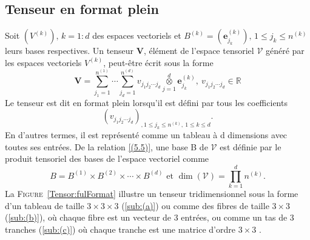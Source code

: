 \documentclass[11pt,a4paper,oneside]{book}
\def\R{\mathbb R}
\def\V{\mathcal V}
\def\vey{\mathbf V}
\def\tensor{\overset{d}{\underset{j=1}{\otimes}}}
\def\e{\mathbf e}
\newcommand{\figref}[1]{\textsc{Figure}~\ref{#1}}
\begin{document}
\subsection{Tenseur en format plein}
Soit $ \left(V^{(k)}\right),\, k=1:d $ des espaces vectoriels et $ B^{(k)}=\left(\e_{j_{k}}^{(k)}\right),\,1\leq j_{k}\leq n^{(k)} $ leurs bases respectives. Un tenseur $ \vey $, élément de l'espace tensoriel $ \V $ généré par les espaces vectoriels $ V^{(k)} $, peut-être écrit sous la forme 
\begin{equation}\label{(5.5)}
\vey =\sum_{j_{1}=1}^{n^{(1)}}\cdots\sum_{j_{d}=1}^{n^{(d)}}v_{j_{1}j_{2}\cdots j_{d}}\tensor \e_{j_{k}}^{(k)},\: v_{j_{1}j_{2}\cdots j_{d}}\in \R 
\end{equation}
Le tenseur est dit en format plein lorsqu'il est défini par tous les coefficients 
$$ \left(v_{j_{1}j_{2}\cdots j_{d}}\right)_{, 1\leq j_{k}\leq n^{(k)},\: 1\leq k\leq d} .$$
En d'autres termes, il est représenté comme un tableau à d dimensions avec toutes ses entrées. De la relation \eqref{(5.5)}, une base B de $ \V $ est définie par le produit tensoriel des bases de l'espace vectoriel comme $$ B=B^{(1)}\times B^{(2)}\times\cdots\times B^{(d)} \text{ et } \dim \left(\V\right)=\prod_{k=1}^{d}n^{(k)}. $$
La \figref{Tensor:fulFormat} illustre un tenseur tridimensionnel sous la forme d'un tableau de taille  $3 \times 3 \times 3$ (\ref{sub:(a)}) ou comme des fibres de taille $3\times 3$ (\ref{sub:(b)}), où chaque fibre est un vecteur de  $3$ entrées, ou comme un tas de  $3$ tranches (\ref{sub:(c)}) où chaque tranche est une matrice d'ordre $3 \times 3$ \cite[p.135]{Nyenyezi2018}.
\end{document}
